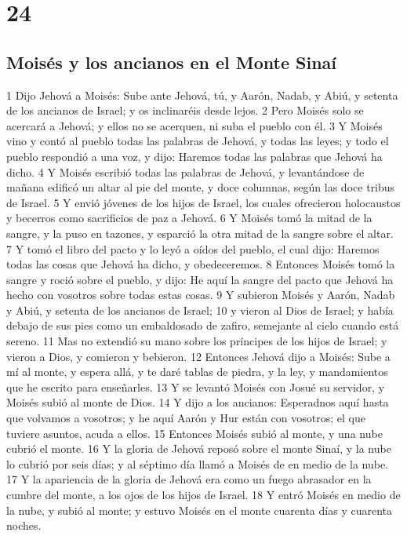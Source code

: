 \chapter{24}

\section*{Moisés y los ancianos en el Monte Sinaí}

1 Dijo Jehová a Moisés: Sube ante Jehová, tú, y Aarón, Nadab, y Abiú, y setenta de los ancianos de Israel; y os inclinaréis desde lejos.
2 Pero Moisés solo se acercará a Jehová; y ellos no se acerquen, ni suba el pueblo con él.
3 Y Moisés vino y contó al pueblo todas las palabras de Jehová, y todas las leyes; y todo el pueblo respondió a una voz, y dijo: Haremos todas las palabras que Jehová ha dicho.
4 Y Moisés escribió todas las palabras de Jehová, y levantándose de mañana edificó un altar al pie del monte, y doce columnas, según las doce tribus de Israel.
5 Y envió jóvenes de los hijos de Israel, los cuales ofrecieron holocaustos y becerros como sacrificios de paz a Jehová.
6 Y Moisés tomó la mitad de la sangre, y la puso en tazones, y esparció la otra mitad de la sangre sobre el altar.
7 Y tomó el libro del pacto y lo leyó a oídos del pueblo, el cual dijo: Haremos todas las cosas que Jehová ha dicho, y obedeceremos.
8 Entonces Moisés tomó la sangre y roció sobre el pueblo, y dijo: He aquí la sangre del pacto que Jehová ha hecho con vosotros sobre todas estas cosas.
9 Y subieron Moisés y Aarón, Nadab y Abiú, y setenta de los ancianos de Israel;
10 y vieron al Dios de Israel; y había debajo de sus pies como un embaldosado de zafiro, semejante al cielo cuando está sereno.
11 Mas no extendió su mano sobre los príncipes de los hijos de Israel; y vieron a Dios, y comieron y bebieron.
12 Entonces Jehová dijo a Moisés: Sube a mí al monte, y espera allá, y te daré tablas de piedra, y la ley, y mandamientos que he escrito para enseñarles.
13 Y se levantó Moisés con Josué su servidor, y Moisés subió al monte de Dios.
14 Y dijo a los ancianos: Esperadnos aquí hasta que volvamos a vosotros; y he aquí Aarón y Hur están con vosotros; el que tuviere asuntos, acuda a ellos.
15 Entonces Moisés subió al monte, y una nube cubrió el monte.
16 Y la gloria de Jehová reposó sobre el monte Sinaí, y la nube lo cubrió por seis días; y al séptimo día llamó a Moisés de en medio de la nube.
17 Y la apariencia de la gloria de Jehová era como un fuego abrasador en la cumbre del monte, a los ojos de los hijos de Israel.
18 Y entró Moisés en medio de la nube, y subió al monte; y estuvo Moisés en el monte cuarenta días y cuarenta noches.

